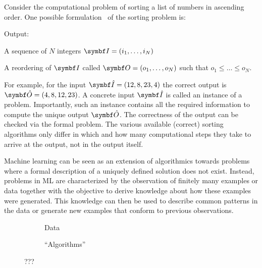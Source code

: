 Consider the computational problem of sorting a list of numbers in ascending order.
One possible formulation~\parencite{cormen_introduction_2009} of the sorting problem is:
\begin{problem}[Sorting]
\label{prob:bayesian_ml:sorting}
\begin{labeling}{Output:}
    \item[Input:] A sequence of $N$ integers $\mat{I} = (i_1, \dots, i_N)$
    \item[Output:] A reordering of $\mat{I}$ called $\mat{O} = (o_1, \dots, o_N)$ such that $o_1 \leq \dots \leq o_N$.
\end{labeling}
\end{problem}
For example, for the input $\mat{\hat{I}}=(12, 8, 23, 4)$ the correct output is $\mat{\hat{O}}=(4, 8, 12, 23)$.
A concrete input $\mat{\hat{I}}$ is called an instance of a problem.
Importantly, such an instance contains all the required information to compute the unique output $\mat{\hat{O}}$.
The correctness of the output can be checked via the formal problem.
The various available (correct) sorting algorithms only differ in which and how many computational steps they take to arrive at the output, not in the output itself.

Machine learning can be seen as an extension of algorithmics towards problems where a formal description of a uniquely defined solution does not exist.
Instead, problems in ML are characterized by the observation of finitely many examples or data together with the objective to derive knowledge about how these examples were generated.
This knowledge can then be used to describe common patterns in the data or generate new examples that conform to previous observations.

\begin{figure}[t]
    \begin{subfigure}[b]{\halffigurewidth}
        \centering
        \caption{
            Data
            \label{fig:bayesian_ml:polynomials:data}
        }
    \end{subfigure}
    \hfill
    \begin{subfigure}[b]{\halffigurewidth}
        \centering
        \caption{
            \enquote{Algorithms}
            \label{fig:bayesian_ml:polynomials:lagrange}
        }
    \end{subfigure}
    \caption[Algorithmic Interpolation]{
        ???
        \label{fig:bayesian_ml:polynoms}
    }
\end{figure}

